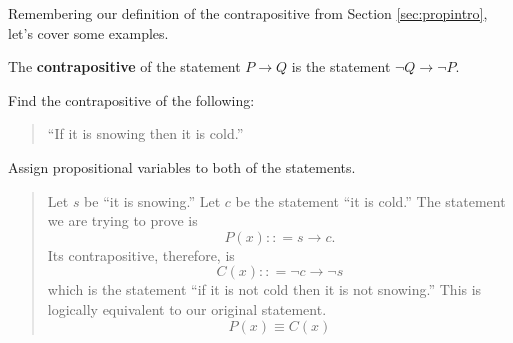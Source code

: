 Remembering our definition of the contrapositive from Section \ref{sec:propintro}, let's cover some examples.
\begin{defn}
  The \textbf{contrapositive} of the statement \(P \to Q \) is the statement \(\neg Q \to \neg P\).
\end{defn}

\begin{ex}
  Find the contrapositive of the following:
  \begin{quote}
    ``If it is snowing then it is cold.''
  \end{quote}
  \begin{sol}
    Assign propositional variables to both of the statements.
    \begin{quote}
      Let $s$ be ``it is snowing.'' Let $c$ be the statement ``it is cold.''
      The statement we are trying to prove is
      \[ P(x) : : = s\to c.\]
      Its contrapositive, therefore, is
      \[ C(x) : : = \neg c \to \neg s \]
      which is the statement ``if it is not cold then it is not snowing.''
      This is logically equivalent to our original statement.
      \[ P(x) \equiv C(x) \]
    \end{quote}
  \end{sol}
\end{ex}
